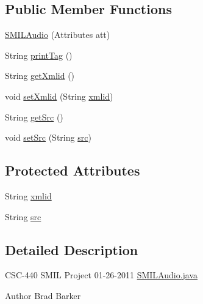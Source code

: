 \subsection*{Public Member Functions}
\begin{DoxyCompactItemize}
\item 
\hyperlink{classcsc440_1_1nuf_1_1components_1_1_s_m_i_l_audio_ac4389b9bffc1d3562f3233190a3b2caa}{S\-M\-I\-L\-Audio} (Attributes att)
\item 
String \hyperlink{classcsc440_1_1nuf_1_1components_1_1_s_m_i_l_audio_a855b8f0b5bbd31473130ba5f4834639a}{print\-Tag} ()
\item 
String \hyperlink{classcsc440_1_1nuf_1_1components_1_1_s_m_i_l_audio_a7ab667bfb856659aa5b30b05256ba1ca}{get\-Xmlid} ()
\item 
void \hyperlink{classcsc440_1_1nuf_1_1components_1_1_s_m_i_l_audio_a7e54acd192f2685de81df7f87ef5ca45}{set\-Xmlid} (String \hyperlink{classcsc440_1_1nuf_1_1components_1_1_s_m_i_l_audio_a6e5d5517217155497b83ec5f9cab8f53}{xmlid})
\item 
String \hyperlink{classcsc440_1_1nuf_1_1components_1_1_s_m_i_l_audio_a0316fbbbc88d046fe6dcf4b7849c2c79}{get\-Src} ()
\item 
void \hyperlink{classcsc440_1_1nuf_1_1components_1_1_s_m_i_l_audio_a4dca9500971fc82cd951c97348457a7a}{set\-Src} (String \hyperlink{classcsc440_1_1nuf_1_1components_1_1_s_m_i_l_audio_a482173b3a842129f333212e31827bbba}{src})
\end{DoxyCompactItemize}
\subsection*{Protected Attributes}
\begin{DoxyCompactItemize}
\item 
String \hyperlink{classcsc440_1_1nuf_1_1components_1_1_s_m_i_l_audio_a6e5d5517217155497b83ec5f9cab8f53}{xmlid}
\item 
String \hyperlink{classcsc440_1_1nuf_1_1components_1_1_s_m_i_l_audio_a482173b3a842129f333212e31827bbba}{src}
\end{DoxyCompactItemize}


\subsection{Detailed Description}
C\-S\-C-\/440 S\-M\-I\-L Project 01-\/26-\/2011 \hyperlink{_s_m_i_l_audio_8java}{S\-M\-I\-L\-Audio.\-java} \begin{DoxyAuthor}{Author}
Brad Barker 
\end{DoxyAuthor}



